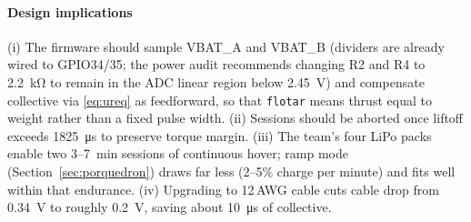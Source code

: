 \paragraph{Design implications}
(i) The firmware should sample VBAT\_A and VBAT\_B (dividers are already wired to GPIO34/35; the power audit recommends changing R2 and R4 to \SI{2.2}{\kilo\ohm} to remain in the ADC linear region below \SI{2.45}{\volt}) and compensate collective via \eqref{eq:ureq} as feedforward, so that \texttt{flotar} means thrust equal to weight rather than a fixed pulse width. (ii) Sessions should be aborted once liftoff exceeds \SI{1825}{\micro\second} to preserve torque margin. (iii) The team's four LiPo packs enable two 3--\SI{7}{\minute} sessions of continuous hover; ramp mode (Section~\ref{sec:porquedron}) draws far less (2--5\% charge per minute) and fits well within that endurance. (iv) Upgrading to 12\,AWG cable cuts cable drop from \SI{0.34}{\volt} to roughly \SI{0.2}{\volt}, saving about \SI{10}{\micro\second} of collective.
